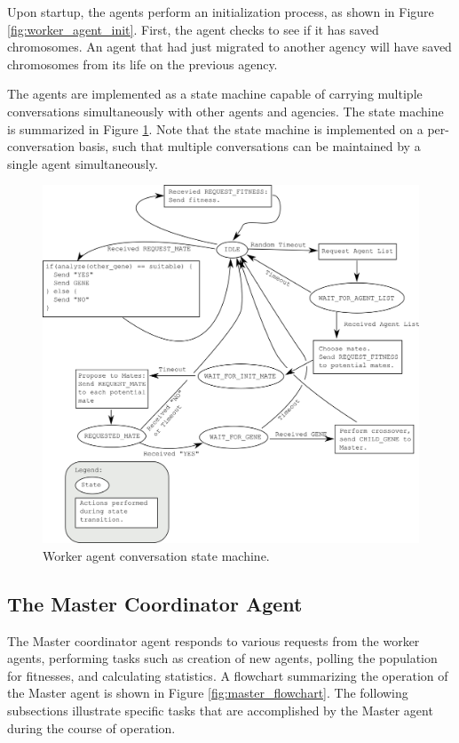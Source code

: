       Upon startup, the agents perform an initialization process, as shown
      in Figure \ref{fig:worker_agent_init}.
      First, the agent checks to see if it has saved chromosomes. 
      An agent that had just migrated to another agency will have saved
        chromosomes from its life on the previous agency. 

      The agents are implemented as a state machine capable of carrying multiple
        conversations simultaneously with other agents and agencies. 
      The state machine is summarized in Figure \ref{fig:gaAgentStateMachine}.
      Note that the state machine is implemented on a per-conversation basis, such that
        multiple conversations can be maintained by a single agent simultaneously. 

      \begin{figure}[!ht]
      \begin{center}
         \includegraphics[width=5in]{figures/convo_state_diagram}
      \end{center}
      \caption{\label{fig:gaAgentStateMachine}Worker agent conversation state machine.}
      \end{figure}
    
    

    \subsection{The Master Coordinator Agent} %
      The Master coordinator agent responds to various requests from the worker agents,
        performing tasks such as creation of new agents, polling the population for
        fitnesses, and calculating statistics.
      A flowchart summarizing the operation of the Master agent is shown in
        Figure \ref{fig:master_flowchart}.
      The following subsections illustrate specific tasks that are accomplished
        by the Master agent during the course of operation.

